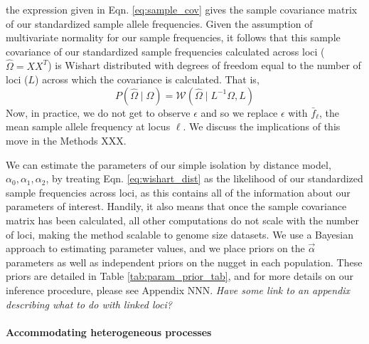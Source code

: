 \documentclass[12pt]{article}
\newcommand{\gc}[1]{{\em \color{blue} #1}}
\begin{document}
the expression given in Eqn. \eqref{eq:sample_cov} gives the sample covariance matrix of our standardized sample allele frequencies.
Given the assumption of multivariate normality for our sample frequencies, it follows that this sample covariance of our standardized sample frequencies calculated across loci ($\widehat{\Omega} = X X^T$) is Wishart distributed with degrees of freedom equal to the number of loci ($L$) across which the covariance is calculated.
That is, 
\begin{equation}
\label{eq:wishart_dist}
P(\widehat{\Omega} \mid \Omega) = \mathcal{W}\left(\widehat{\Omega} \mid L^{-1} \Omega,L \right)
\end{equation}
Now, in practice, we do not get to observe $\epsilon$ and so we replace $\epsilon$ with $\bar{f}_{\ell}$, the mean sample allele frequency at locus  $\ell$. We discuss the implications of this move in the Methods XXX.

We can estimate the parameters of our simple isolation by distance model, $\alpha_0,\alpha_1, \alpha_2$, by treating Eqn. \eqref{eq:wishart_dist} as the likelihood of our standardized sample frequencies across loci, as this contains all of the information about our parameters of interest.  Handily, it also means that once the sample covariance matrix has been calculated, all other computations do not scale with the number of loci, making the method scalable to genome size datasets.  We use a Bayesian approach to estimating parameter values, and we place priors on the $\vec{\alpha}$ parameters as well as independent priors on the nugget in each population. These priors are detailed in Table \ref{tab:param_prior_tab}, and for more details on our inference procedure, please see Appendix NNN.  \gc{Have some link to an appendix describing what to do with linked loci?}

\paragraph{Accommodating heterogeneous processes}
\end{document}
